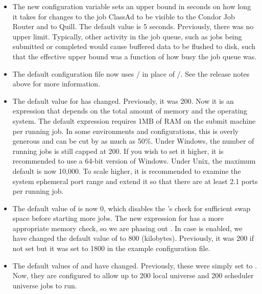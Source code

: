 \begin{itemize}

\item The new configuration variable 
   sets an
  upper bound in seconds on how long it takes for changes to the job
  ClassAd to be visible to the Condor Job Router and to Quill.
  The default value is 5 seconds.
  Previously, there was no upper limit.  Typically, other activity in
  the job queue, such as jobs being submitted or completed would cause
  buffered data to be flushed to disk, such that the effective upper bound was
  a function of how busy the job queue was.

\item The default configuration file now uses
  / in place of
  /.  See the release notes above
  for more information.

\item The default value for  has changed.
  Previously, it was 200.  Now it is an expression that depends on the
  total amount of memory and the operating system.  The default
  expression requires 1MB of RAM on the submit machine per running
  job.  In some environments and configurations, this is overly
  generous and can be cut by as much as 50\%.  Under Windows, the
  number of running jobs is still capped at 200.  If you wish to set
  it higher, it is recommended to use a 64-bit version of Windows.
  Under Unix, the maximum default is now 10,000.  To scale higher, it
  is recommended to examine the system ephemeral port range and extend
  it so that there are at least 2.1 ports per running job.

\item The default value of  is now 0, which
  disables the 's check for sufficient swap space
  before starting more jobs.  The new expression for
   has a more appropriate memory check, so
  we are phasing out .  In case
   is enabled, we have changed the default value
  of  to 800 (kilobytes).  Previously,
  it was 200 if not set but it was set to 1800 in the example configuration
  file.

\item The default values of  and
   have changed.  Previously,
  these were simply set to .  Now, they are configured to allow
  up to 200 local universe and 200 scheduler universe jobs to run.


\end{itemize}
